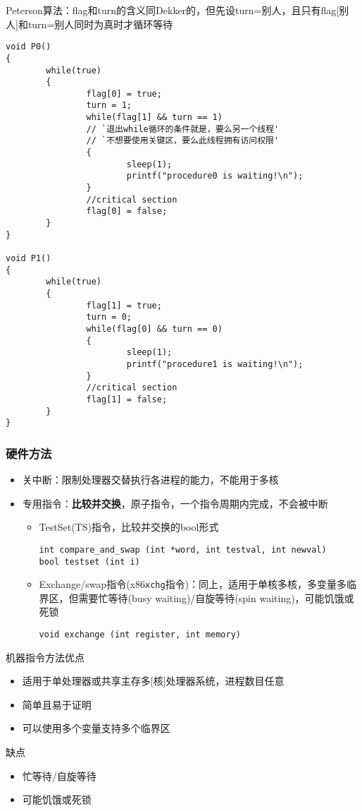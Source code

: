 Peterson算法：flag和turn的含义同Dekker的，但先设turn=别人，且只有flag[别人]和turn=别人同时为真时才循环等待
\begin{lstlisting}
void P0()
{
        while(true)
        {
                flag[0] = true;
                turn = 1;
                while(flag[1] && turn == 1)
                // `退出while循环的条件就是，要么另一个线程'
                // `不想要使用关键区，要么此线程拥有访问权限'
                {
                        sleep(1);
                        printf("procedure0 is waiting!\n");
                }
                //critical section
                flag[0] = false;
        }
}

void P1()
{
        while(true)
        {
                flag[1] = true;
                turn = 0;
                while(flag[0] && turn == 0)
                {
                        sleep(1);
                        printf("procedure1 is waiting!\n");
                }
                //critical section
                flag[1] = false;
        }
}
\end{lstlisting}

\subsubsection{硬件方法}
\begin{itemize}
    \item 关中断：限制处理器交替执行各进程的能力，不能用于多核
    \item 专用指令：\textbf{比较并交换}，原子指令，一个指令周期内完成，不会被中断
    \begin{itemize}
        \item TestSet(TS)指令，比较并交换的bool形式
\begin{lstlisting}
int compare_and_swap (int *word, int testval, int newval)
bool testset (int i)
\end{lstlisting}
        \item Exchange/swap指令(x86\verb'xchg'指令)：同上，适用于单核多核，多变量多临界区，但需要忙等待(busy waiting)/自旋等待(spin waiting)，可能饥饿或死锁
\begin{lstlisting}
void exchange (int register, int memory)
\end{lstlisting}
    \end{itemize}
\end{itemize}

机器指令方法优点
\begin{itemize}
    \item 适用于单处理器或共享主存多[核]处理器系统，进程数目任意
    \item 简单且易于证明
    \item 可以使用多个变量支持多个临界区
\end{itemize}
缺点
\begin{itemize}
    \item 忙等待/自旋等待
    \item 可能饥饿或死锁
\end{itemize}

